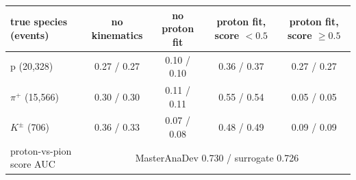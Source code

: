 \begin{tabular}{lcccc}
\toprule
true species (events) & no kinematics & no proton fit & proton fit, score $<0.5$ & proton fit, score $\geq 0.5$ \\
\midrule
p (20,328) & 0.27 / 0.27 & 0.10 / 0.10 & 0.36 / 0.37 & 0.27 / 0.27 \\
$\pi^+$ (15,566) & 0.30 / 0.30 & 0.11 / 0.11 & 0.55 / 0.54 & 0.05 / 0.05 \\
$K^\pm$ (706) & 0.36 / 0.33 & 0.07 / 0.08 & 0.48 / 0.49 & 0.09 / 0.09 \\
\midrule
proton-vs-pion score AUC & \multicolumn{4}{c}{MasterAnaDev 0.730 / surrogate 0.726} \\
\bottomrule
\end{tabular}
